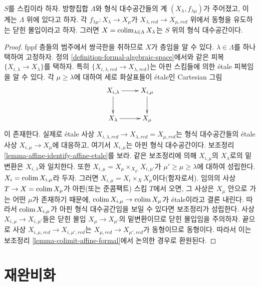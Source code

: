 \begin{lemma}
\label{lemma-colimit-formal-spaces-is-formal-space}
$S$를 스킴이라 하자. 방향집합 $\Lambda$와 형식 대수공간들의 계
$(X_\lambda, f_{\lambda \mu})$가 주어졌고, 이 계는 $\Lambda$ 위에 있다고 하자.
각 $f_{\lambda \mu} : X_\lambda \to X_\mu$가
$X_{\lambda, red} \to X_{\mu, red}$ 위에서 동형을 유도하는 닫힌
몰입이라고 하자. 그러면
$X = \mathop{\mathrm{colim}}\nolimits_{\lambda \in \Lambda} X_\lambda$는 $S$ 위의 형식
대수공간이다.
\end{lemma}

\begin{proof}
fppf 층들의 범주에서 쌍극한을 취하므로 $X$가 층임을 알 수 있다.
$\lambda \in \Lambda$를 하나 택하여 고정하자. 정의
\ref{definition-formal-algebraic-space}에서와 같은 피복
$\{X_{i, \lambda} \to X_\lambda\}$를 택하자. 특히
$\{X_{i, \lambda, red} \to X_{\lambda, red}\}$는 아핀 스킴들에
의한 \'etale 피복임을 알 수 있다.
각 $\mu \geq \lambda$에 대하여 세로 화살표들이 \'etale인
Cartesian 그림
$$
\xymatrix{
X_{i, \lambda} \ar[r] \ar[d] & X_{i, \mu} \ar[d] \\
X_\lambda \ar[r] & X_\mu
}
$$
이 존재한다. 실제로 \'etale 사상
$X_{i, \lambda, red} \to X_{\lambda, red} = X_{\mu, red}$는
형식 대수공간들의 \'etale 사상 $X_{i, \mu} \to X_\mu$에 대응하고,
여기서 $X_{i, \mu}$는 아핀 형식 대수공간이다. 보조정리
\ref{lemma-affine-identify-affine-etale}를 보라.
같은 보조정리에 의해 $X_{i, \mu}$의 $X_\lambda$로의 밑변환은
$X_{i, \lambda}$와 일치한다. 또한
$X_{i, \mu} = X_\mu \times_{X_{\mu'}} X_{i, \mu'}$가
$\mu' \geq \mu \geq \lambda$에 대하여 성립한다.
$X_i = \mathop{\mathrm{colim}}\nolimits X_{i, \mu}$라 두자.
그러면 $X_{i, \mu} = X_i \times_X X_\mu$이다(함자로서).
임의의 사상 $T \to X = \mathop{\mathrm{colim}}\nolimits X_\mu$가 아핀(또는 준콤팩트)
스킴 $T$에서 오면, 그 사상은 $X_\mu$ 안으로 가는 어떤
$\mu$가 존재하기 때문에,
$\mathop{\mathrm{colim}}\nolimits X_{i, \mu} \to \mathop{\mathrm{colim}}\nolimits X_\mu$가 \'etale이라고 결론 내린다.
따라서 $\mathop{\mathrm{colim}}\nolimits X_{i, \mu}$가 아핀 형식 대수공간임을 보일 수 있다면
보조정리가 성립한다.
사상 $X_{i, \mu} \to X_{i, \mu'}$들은 닫힌 몰입
$X_\mu \to X_{\mu'}$의 밑변환이므로 닫힌 몰입임을 주의하자.
끝으로 사상 $X_{i, \mu, red} \to X_{i, \mu', red}$는
$X_{\mu, red} \to X_{\mu', red}$가 동형이므로 동형이다.
따라서 이는 보조정리 \ref{lemma-colimit-affine-formal}에서 논의한
경우로 환원된다.
\end{proof}

\section{재완비화}
\label{section-recompletion}

